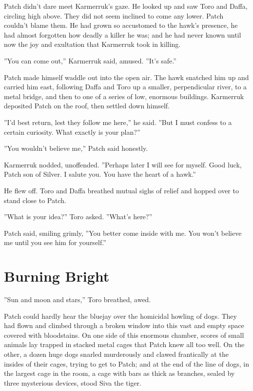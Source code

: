 \documentclass[12pt]{book}
\begin{document}
Patch didn't dare meet Karmerruk's gaze. He looked up and saw Toro and Daffa, circling high above. They did not seem inclined to come any lower. Patch couldn't blame them. He had grown so accustomed to the hawk's presence, he had almost forgotten how deadly a killer he was; and he had never known until now the joy and exultation that Karmerruk took in killing.

''You can come out,'' Karmerruk said, amused. ''It's safe.''

Patch made himself waddle out into the open air. The hawk snatched him up and carried him east, following Daffa and Toro up a smaller, perpendicular river, to a metal bridge, and then to one of a series of low, enormous buildings. Karmerruk deposited Patch on the roof, then settled down himself.

''I'd best return, lest they follow me here,'' he said. ''But I must confess to a certain curiosity. What exactly is your plan?''

''You wouldn't believe me,'' Patch said honestly.

Karmerruk nodded, unoffended. ''Perhaps later I will see for myself. Good luck, Patch son of Silver. I salute you. You have the heart of a hawk.''

He flew off. Toro and Daffa breathed mutual sighs of relief and hopped over to stand close to Patch.

''What is your idea?'' Toro asked. ''What's here?''

Patch said, smiling grimly, ''You better come inside with me. You won't believe me until you see him for yourself.''


\section{Burning Bright}

''Sun and moon and stars,'' Toro breathed, awed.

Patch could hardly hear the bluejay over the homicidal howling of dogs. They had flown and climbed through a broken window into this vast and empty space covered with bloodstains. On one side of this enormous chamber, scores of small animals lay trapped in stacked metal cages that Patch knew all too well. On the other, a dozen huge dogs snarled murderously and clawed frantically at the insides of their cages, trying to get to Patch; and at the end of the line of dogs, in the largest cage in the room, a cage with bars as thick as branches, sealed by three mysterious devices, stood Siva the tiger.
\end{document}
